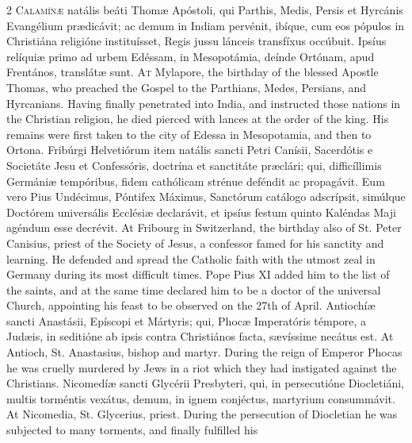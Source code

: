 \begin{paracol}{2}
\lettrine[lines=2]{C}{alamínæ} natális beáti Thomæ Apóstoli, qui 
 Parthis, Medis, Persis et Hyrcánis Evangélium prædicávit; ac demum in Indiam 
 pervénit, ibíque, cum eos pópulos in Christiána religióne instituísset, 
 Regis jussu lánceis transfíxus occúbuit. Ipsíus relíquiæ primo ad 
 urbem Edéssam, in Mesopotámia, deínde Ortónam, apud Frentános, translátæ 
 sunt.
\switchcolumn
{}
\lettrine[lines=2]{A}{t} Mylapore, the birthday of the blessed Apostle Thomas, who preached the 
 Gospel to the Parthians, Medes, Persians, and Hyrcanians. Having 
 finally penetrated into India, and instructed those nations in the Christian 
 religion, he died pierced with lances at the order of the king. His 
 remains were first taken to the city of Edessa in Mesopotamia, and then to 
 Ortona.
\switchcolumn*
{}
Fribúrgi Helvetiórum item natális sancti Petri Canísii, Sacerdótis e 
 Societáte Jesu et Confessóris, doctrína et sanctitáte præclári; 
 qui, difficíllimis Germániæ tempóribus, fidem cathólicam strénue deféndit ac 
 propagávit. Eum vero Pius Undécimus, Póntifex Máximus, Sanctórum 
 catálogo adscrípsit, simúlque Doctórem universális Ecclésiæ declarávit, et 
 ipsíus festum quinto Kaléndas Maji agéndum esse decrévit.
\switchcolumn
{}
At Fribourg in Switzerland, the birthday also of St. Peter Canisius, priest 
 of the Society of Jesus, a confessor famed for his sanctity and learning. 
 He defended and spread the Catholic faith with the utmost zeal in Germany 
 during its most difficult times. Pope Pius XI added him to the list of 
 the saints, and at the same time declared him to be a doctor of the 
 universal Church, appointing his feast to be observed on the 27th of April.
\switchcolumn*
{}
Antiochíæ sancti Anastásii, Epíscopi et 
 Mártyris; qui, Phocæ Imperatóris témpore, a Judæis, in seditióne ab ipsis 
 contra Christiános facta, sævíssime necátus est.
\switchcolumn
{}
At Antioch, St. Anastasius, bishop and martyr. During the reign of 
 Emperor Phocas he was cruelly murdered by Jews in a riot which they had 
 instigated against the Christians.
\switchcolumn*
{}
Nicomedíæ sancti Glycérii Presbyteri, qui, in 
 persecutióne Diocletiáni, multis torméntis vexátus, demum, in ignem 
 conjéctus, martyrium consummávit.
\switchcolumn
{}
At Nicomedia, St. Glycerius, priest. During the persecution of 
 Diocletian he was subjected to many torments, and finally fulfilled his 

\end{paracol}
